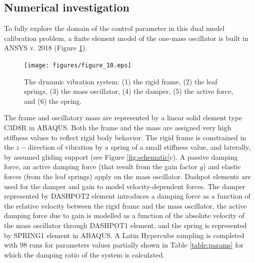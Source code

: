 \documentclass[10pt]{asme2ej}
\begin{document}
%
\subsection{Numerical investigation}
%
To fully explore the domain of the control parameter in this dual model calibration problem, a finite element model of the one-mass oscillator is built in ANSYS v. 2018 (Figure \ref{fig:dvs}).
%
\begin{figure}
	\centering
	\texttt{[image: figures/figure\_10.eps]}
	\captionsetup{width=.85\linewidth}
	\caption{The dynamic vibration system: (1) the rigid frame, (2) the leaf springs, (3) the mass oscillator, (4) the damper, (5) the active force, and (6) the spring.}
	\label{fig:dvs}
\end{figure}
%
The frame and oscillatory mass are represented by a linear solid element type C3D8R in ABAQUS. 
%
Both the frame and the mass are assigned very high stiffness values to reflect rigid body behavior. 
%
%
The rigid frame is constrained in the $z-$direction of vibration by a spring of a small stiffness value, and laterally, by assumed gliding support (see Figure \ref{fig:schematic}c). 
%
A passive damping force, an active damping force (that result from the gain factor $g$) and elastic forces (from the leaf springs) apply on the mass oscillator. 
%
Dashpot elements are used for the damper and gain to model velocity-dependent forces. 
%
The damper represented by DASHPOT2 element introduces a damping force as a function of the relative velocity between the rigid frame and the mass oscillator, the active damping force due to gain is modelled as a function of the absolute velocity of the mass oscillator through DASHPOT1 element, and the spring is represented by SPRING1 element in ABAQUS.
%
A Latin Hypercube sampling is completed with 98 runs for parameters values partially shown in Table \ref{table:params} for which the damping ratio of the system is calculated. 
%
\end{document}
